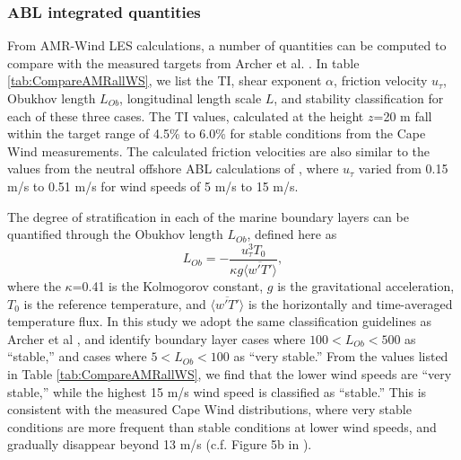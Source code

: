 \subsubsection{\label{sec:stableABLStats} ABL integrated quantities}

From AMR-Wind LES calculations, a number of quantities can be computed
to compare with the measured targets from Archer et al. 
\cite{archer2016predominance}.  In
table \ref{tab:CompareAMRallWS}, we list the TI, shear exponent
$\alpha$, friction velocity $u_\tau$, Obukhov length $L_{Ob}$,
longitudinal length scale $L$, and stability classification for each of
these three cases.  The TI values, calculated at the height $z$=20 m
fall within the target range of 4.5\% to 6.0\% for stable conditions
from the Cape Wind measurements.  The calculated friction velocities
are also similar to the values from the neutral offshore ABL
calculations of \cite{cheung2020large}, where $u_\tau$ varied from
0.15 m/s to 0.51 m/s for wind speeds of 5 m/s to 15 m/s.

The degree of stratification in each of the marine boundary layers can
be quantified through the Obukhov length $L_{Ob}$, defined here as
\begin{equation}
  L_{Ob} = -\frac{u_\tau^3 T_0}{\kappa g \langle \overline{w'T'} \rangle},
\end{equation}
where the $\kappa$=0.41 is the Kolmogorov constant, $g$ is the
gravitational acceleration, $T_0$ is the reference temperature, and
$\langle \overline{w'T'} \rangle$ is the horizontally and
time-averaged temperature flux.  In this study we adopt the same
classification guidelines as Archer et al
\cite{archer2016predominance}, and identify boundary layer cases where
$100 < L_{Ob} < 500$ as ``stable,'' and cases where $5 < L_{Ob}<100$
as ``very stable.''  From the values listed in Table
\ref{tab:CompareAMRallWS}, we find that the lower wind speeds are
``very stable,'' while the highest 15 m/s wind speed is classified as
``stable.''  This is consistent with the measured Cape Wind
distributions, where very stable conditions are more frequent than
stable conditions at lower wind speeds, and gradually disappear beyond
13 m/s (c.f. Figure 5b in \cite{archer2016predominance}).


